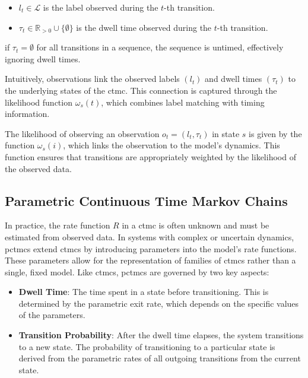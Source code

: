 \begin{itemize}
    \item $l_t \in \mathcal{L}$ is the label observed during the $t$-th transition.
    \item $\tau_t \in \mathbb{R}_{>0} \cup \{\emptyset\}$ is the dwell time observed during the $t$-th transition.
\end{itemize}

if $\tau_t = \emptyset$ for all transitions in a sequence, the sequence is untimed, effectively ignoring dwell times.

Intuitively, observations link the observed labels $(l_t)$ and dwell times $(\tau_t)$ to the underlying states of the \gls{ctmc}.
This connection is captured through the likelihood function $\omega_s(t)$, which combines label matching with timing information.

The likelihood of observing an observation $o_t = (l_t, \tau_t)$ in state $s$ is given by the function $\omega_s(i)$, which links the observation to the model's dynamics.
This function ensures that transitions are appropriately weighted by the likelihood of the observed data.

\subsection{Parametric Continuous Time Markov Chains}\label{subsec:parametric-ctmc}
In practice, the rate function $R$ in a \gls{ctmc} is often unknown and must be estimated from observed data.
In systems with complex or uncertain dynamics, \glspl{pctmc} extend \glspl{ctmc} by introducing parameters into the model's rate functions.
These parameters allow for the representation of families of \glspl{ctmc} rather than a single, fixed model.
Like \glspl{ctmc}, \glspl{pctmc} are governed by two key aspects:

\begin{itemize}
    \item \textbf{Dwell Time}: The time spent in a state before transitioning.
    This is determined by the parametric exit rate, which depends on the specific values of the parameters.
    \item \textbf{Transition Probability}: After the dwell time elapses, the system transitions to a new state.
    The probability of transitioning to a particular state is derived from the parametric rates of all outgoing transitions from the current state.
\end{itemize}

